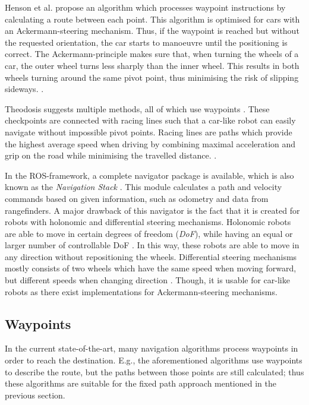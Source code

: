 \documentclass[conference,a4paper]{IEEEtran}
\begin{document}
Henson et al. \cite{Henson2008} propose an algorithm which processes waypoint instructions by calculating a route between each point. This algorithm is optimised for cars with an Ackermann-steering mechanism. Thus, if the waypoint is reached but without the requested orientation, the car starts to manoeuvre until the positioning is correct. The Ackermann-principle makes sure that, when turning the wheels of a car, the outer wheel turns less sharply than the inner wheel. This results in both wheels turning around the same pivot point, thus minimising the risk of slipping sideways. \cite{King-Hele2002}. 

Theodosis suggests multiple methods, all of which use waypoints \cite{Theodosis2014}. These checkpoints are connected with racing lines such that a car-like robot can easily navigate without impossible pivot points. Racing lines are paths which provide the highest average speed when driving by combining maximal acceleration and grip on the road while minimising the travelled distance. \cite{Macfarland2015}.

In the ROS-framework, a complete navigator package is available, which is also known as the \emph{Navigation Stack} \cite{Marder-Eppstein2016}\cite{Marder-Eppstein2017}. This module calculates a path and velocity commands based on given information, such as odometry and data from rangefinders. A major drawback of this navigator is the fact that it is created for robots with holonomic and differential steering mechanisms. Holonomic robots are able to move in certain degrees of freedom (\emph{DoF}), while having an equal or larger number of controllable DoF \cite{Mariappan2009}. In this way, these robots are able to move in any direction without repositioning the wheels. Differential steering mechanisms mostly consists of two wheels which have the same speed when moving forward, but different speeds when changing direction \cite{Saidonr2011}. 
Though, it is usable for car-like robots as there exist implementations for Ackermann-steering mechanisms.

\subsection{Waypoints}
In the current state-of-the-art, many navigation algorithms process waypoints in order to reach the destination. E.g., the aforementioned algorithms \cite{Henson2008}\cite{Theodosis2014} use waypoints to describe the route, but the paths between those points are still calculated; thus these algorithms are suitable for the fixed path approach mentioned in the previous section.
\end{document}

